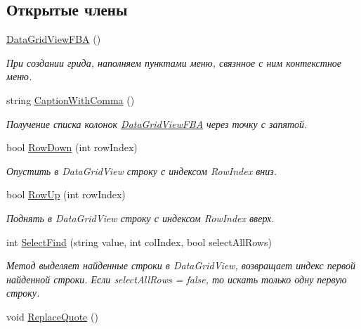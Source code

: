 \subsection*{Открытые члены}
\begin{DoxyCompactItemize}
\item 
\mbox{\hyperlink{class_f_b_a_1_1_data_grid_view_f_b_a_aa8298ce47b4a241d028f5221925151d6}{Data\+Grid\+View\+F\+BA}} ()
\begin{DoxyCompactList}\small\item\em При создании грида, наполняем пунктами меню, связнное с ним контекстное меню. \end{DoxyCompactList}\item 
string \mbox{\hyperlink{class_f_b_a_1_1_data_grid_view_f_b_a_a4388064e72c70819b06c2213c86aea9c}{Caption\+With\+Comma}} ()
\begin{DoxyCompactList}\small\item\em Получение списка колонок \mbox{\hyperlink{class_f_b_a_1_1_data_grid_view_f_b_a}{Data\+Grid\+View\+F\+BA}} через точку с запятой. \end{DoxyCompactList}\item 
bool \mbox{\hyperlink{class_f_b_a_1_1_data_grid_view_f_b_a_a250c5d0090497b0490f6971a86cd8ed0}{Row\+Down}} (int row\+Index)
\begin{DoxyCompactList}\small\item\em Опустить в Data\+Grid\+View строку с индексом Row\+Index вниз. \end{DoxyCompactList}\item 
bool \mbox{\hyperlink{class_f_b_a_1_1_data_grid_view_f_b_a_af065f90cec3e5673d093c68e81852522}{Row\+Up}} (int row\+Index)
\begin{DoxyCompactList}\small\item\em Поднять в Data\+Grid\+View строку с индексом Row\+Index вверх. \end{DoxyCompactList}\item 
int \mbox{\hyperlink{class_f_b_a_1_1_data_grid_view_f_b_a_af6318986d3c8b1f1c19692fabfb91885}{Select\+Find}} (string value, int col\+Index, bool select\+All\+Rows)
\begin{DoxyCompactList}\small\item\em Метод выделяет найденные строки в Data\+Grid\+View, возвращает индекс первой найденной строки. Если select\+All\+Rows = false, то искать только одну первую строку. \end{DoxyCompactList}\item 
void \mbox{\hyperlink{class_f_b_a_1_1_data_grid_view_f_b_a_aa027e50add0c812eb94c2167ce3c7500}{Replace\+Quote}} ()

\end{DoxyCompactItemize}
